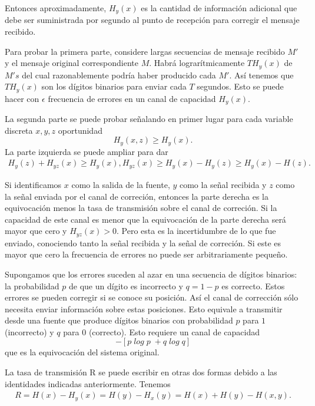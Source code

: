 Entonces aproximadamente, $H_y(x)$ es la cantidad de informaci\'{o}n
adicional que debe ser suministrada por segundo al punto de
recepci\'{o}n para corregir el mensaje recibido.

Para probar la primera parte, considere largas secuencias de mensaje
recibido ${M}'$ y el mensaje original correspondiente $M$. Habr\'{a}
lograr\'{i}tmicamente $TH_y(x)$ de ${M}'s$ del cual razonablemente
podr\'{i}a haber producido cada ${M}'$. As\'{i} tenemos que $TH_y(x)$
son los d\'{i}gitos binarios para enviar cada $T$ segundos. Esto se
puede hacer con $\epsilon$ frecuencia de errores en un canal de
capacidad $H_y(x)$.

La segunda parte se puede probar se\~{n}alando en primer lugar para
cada variable discreta $x, y, z$ oportunidad
\begin{equation}
H_y( x,  z) \geq H_y(x).
\end{equation}
La parte izquierda se puede ampliar para dar
\begin{equation}
\begin{array}{rcl}
H_y(z) + H_{yz}(x) \geq H_y(x),
H_{yz}(x) \geq H_y(x) - H_y(z) \geq H_y(x) - H(z).
\end{array}
\end{equation}

Si identificamos $x$ como la salida de la fuente, $y$ como la
se\~{n}al recibida y $z$ como la se\~{n}al enviada por el canal de
correci\'{o}n, entonces la parte derecha es la equivocaci\'{o}n menos
la tasa de transmisi\'{o}n sobre el canal de correci\'{o}n. Si la
capacidad de este canal es menor que la equivocaci\'{o}n de la parte
derecha ser\'{a} mayor que cero y $H_{yz}(x) > 0$. Pero esta es la
incertidumbre de lo que fue enviado, conociendo tanto la se\~{n}al
recibida y la se\~{n}al de correci\'{o}n. Si este es mayor que cero la
frecuencia de errores no puede ser arbitrariamente peque\~{n}o.

\begin{exmp}
Supongamos que los errores suceden al azar en una secuencia de
d\'{i}gitos binarios: la probabilidad $p$ de que un d\'{i}gito es
incorrecto y $q = 1 - p$ es correcto. Estos errores se pueden corregir
si se conoce su posici\'{o}n. As\'{i} el canal de correcci\'{o}n
s\'{o}lo necesita enviar informaci\'{o}n sobre estas posiciones. Esto
equivale a transmitir desde una fuente que produce d\'{i}gitos
binarios con probabilidad $p$ para $1$ (incorrecto) y $q$ para $0$
(correcto). Esto requiere un canal de capacidad
\begin{equation}
- \left [ p \; log\; p \;+ q\;log\;q \right]
\end{equation}
que es la equivocaci\'{o}n del sistema original.

La tasa de transmisi\'{o}n R se puede escribir en otras dos formas
debido a las identidades indicadas anteriormente. Tenemos
\begin{equation}
\begin{array}{rcl}
R = H(x) - H_y(x)
= H(y) - H_x(y)
= H(x) + H(y) - H(x, y).
\end{array}
\end{equation}
\end{exmp}

